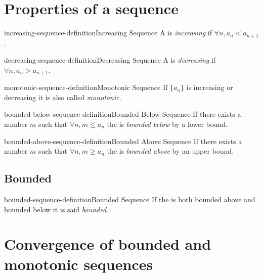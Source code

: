 \documentclass[preview]{standalone}
\begin{document}
\section{Properties of a sequence}

\begin{snippetdefinition}{increasing-sequence-definition}{Increasing Sequence}
    A \sequence is \textit{increasing} if \(\forall n, a_n<a_{n+1}\).
\end{snippetdefinition}

\begin{snippetdefinition}{decreasing-sequence-definition}{Decreasing Sequence}
    A \sequence is \textit{decreasing} if \(\forall n, a_n>a_{n+1}\).
\end{snippetdefinition}

\begin{snippetdefinition}{monotonic-sequence-definition}{Monotonic Sequence}
    If \(\{a_n\}\) is increasing or decreasing it is also called \textit{monotonic}.
\end{snippetdefinition}

\begin{snippetdefinition}{bounded-below-sequence-definition}{Bounded Below Sequence}
    If there exists a number \(m\) such that \(\forall n, m \leq a_n\)
    the \sequence is \textit{bounded below} by a lower bound.
\end{snippetdefinition}

\begin{snippetdefinition}{bounded-above-sequence-definition}{Bounded Above Sequence}
    If there exists a number \(m\) such that \(\forall n, m \geq a_n\)
    the \sequence is \textit{bounded above} by an upper bound.
\end{snippetdefinition}

\subsection{Bounded}

\begin{snippetdefinition}{bounded-sequence-definition}{Bounded Sequence}
    If the \sequence is both bounded above and bounded below it is
    said \textit{bounded}.
\end{snippetdefinition}

\section{Convergence of bounded and monotonic sequences}
\end{document}

